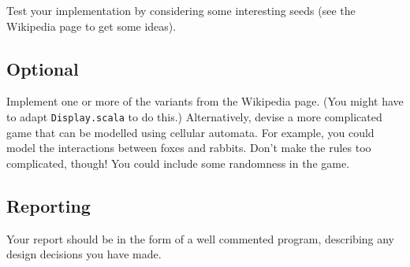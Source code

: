 \documentclass{../csopractical}
\begin{document}

Test your implementation by considering some interesting seeds (see the
Wikipedia page to get some ideas).


\subsection*{Optional}

Implement one or more of the variants from the Wikipedia page.  (You might
have to adapt {\tt Display.scala} to do this.)
%
Alternatively, devise a more complicated game that can be modelled using
cellular automata.  For example, you could model the interactions between
foxes and rabbits.  Don't make the rules too complicated, though!  You could
include some randomness in the game.  


\subsection*{Reporting}

Your report should be in the form of a well commented program, describing any
design decisions you have made.

\end{document}
